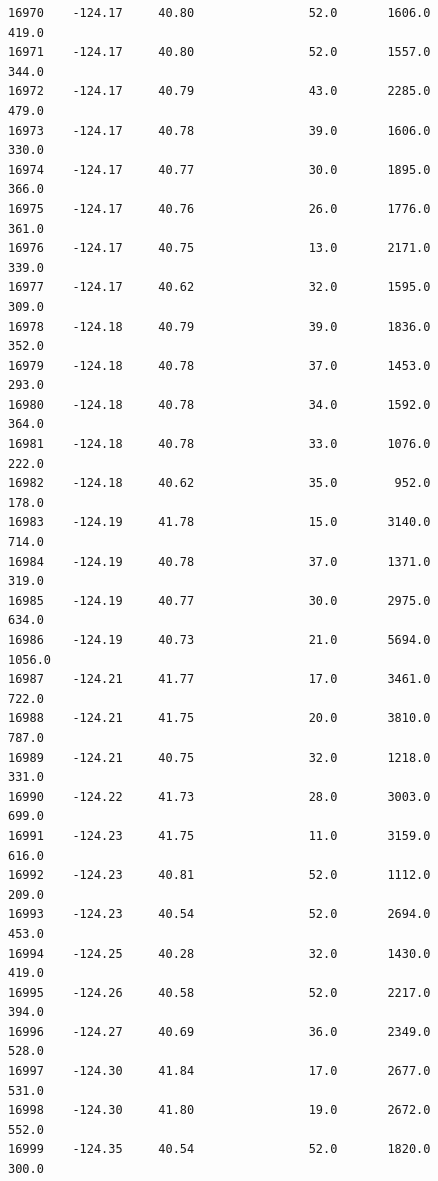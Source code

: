 \begin{lstlisting}[style=outputcell]
16970    -124.17     40.80                52.0       1606.0           419.0   
16971    -124.17     40.80                52.0       1557.0           344.0   
16972    -124.17     40.79                43.0       2285.0           479.0   
16973    -124.17     40.78                39.0       1606.0           330.0   
16974    -124.17     40.77                30.0       1895.0           366.0   
16975    -124.17     40.76                26.0       1776.0           361.0   
16976    -124.17     40.75                13.0       2171.0           339.0   
16977    -124.17     40.62                32.0       1595.0           309.0   
16978    -124.18     40.79                39.0       1836.0           352.0   
16979    -124.18     40.78                37.0       1453.0           293.0   
16980    -124.18     40.78                34.0       1592.0           364.0   
16981    -124.18     40.78                33.0       1076.0           222.0   
16982    -124.18     40.62                35.0        952.0           178.0   
16983    -124.19     41.78                15.0       3140.0           714.0   
16984    -124.19     40.78                37.0       1371.0           319.0   
16985    -124.19     40.77                30.0       2975.0           634.0   
16986    -124.19     40.73                21.0       5694.0          1056.0   
16987    -124.21     41.77                17.0       3461.0           722.0   
16988    -124.21     41.75                20.0       3810.0           787.0   
16989    -124.21     40.75                32.0       1218.0           331.0   
16990    -124.22     41.73                28.0       3003.0           699.0   
16991    -124.23     41.75                11.0       3159.0           616.0   
16992    -124.23     40.81                52.0       1112.0           209.0   
16993    -124.23     40.54                52.0       2694.0           453.0   
16994    -124.25     40.28                32.0       1430.0           419.0   
16995    -124.26     40.58                52.0       2217.0           394.0   
16996    -124.27     40.69                36.0       2349.0           528.0   
16997    -124.30     41.84                17.0       2677.0           531.0   
16998    -124.30     41.80                19.0       2672.0           552.0   
16999    -124.35     40.54                52.0       1820.0           300.0   


\end{lstlisting}
